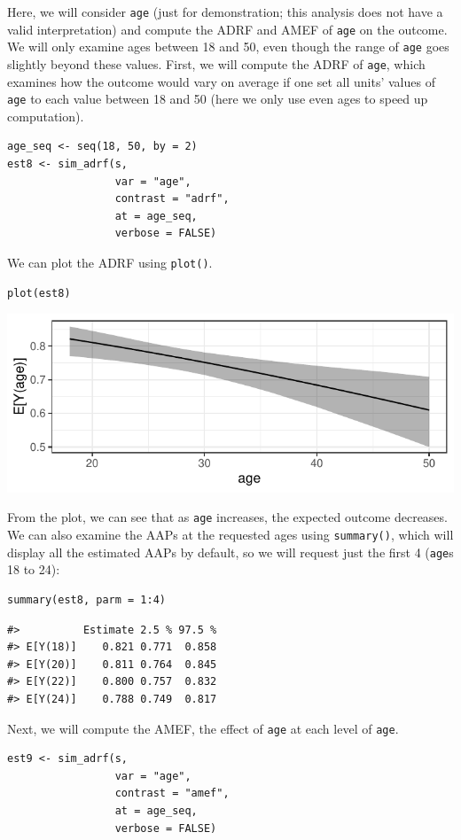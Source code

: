 Here, we will consider \texttt{age} (just for demonstration; this analysis does not have a valid interpretation) and compute the ADRF and AMEF of \texttt{age} on the outcome. We will only examine ages between 18 and 50, even though the range of \texttt{age} goes slightly beyond these values. First, we will compute the ADRF of \texttt{age}, which examines how the outcome would vary on average if one set all units' values of \texttt{age} to each value between 18 and 50 (here we only use even ages to speed up computation).
\begin{verbatim}
age_seq <- seq(18, 50, by = 2)
est8 <- sim_adrf(s,
                 var = "age",
                 contrast = "adrf",
                 at = age_seq,
                 verbose = FALSE)
\end{verbatim}
We can plot the ADRF using \texttt{plot()}.
\begin{verbatim}
plot(est8)
\end{verbatim}
\begin{center}\includegraphics{figures/plot8-1} \end{center}
From the plot, we can see that as \texttt{age} increases, the expected outcome decreases.
We can also examine the AAPs at the requested ages using \texttt{summary()}, which will display all the estimated AAPs by default, so we will request just the first 4 (\texttt{age}s 18 to 24):
\begin{verbatim}
summary(est8, parm = 1:4)
\end{verbatim}
\begin{verbatim}
#>          Estimate 2.5 % 97.5 %
#> E[Y(18)]    0.821 0.771  0.858
#> E[Y(20)]    0.811 0.764  0.845
#> E[Y(22)]    0.800 0.757  0.832
#> E[Y(24)]    0.788 0.749  0.817
\end{verbatim}
Next, we will compute the AMEF, the effect of \texttt{age} at each level of \texttt{age}.
\begin{verbatim}
est9 <- sim_adrf(s,
                 var = "age",
                 contrast = "amef",
                 at = age_seq,
                 verbose = FALSE)
\end{verbatim}
